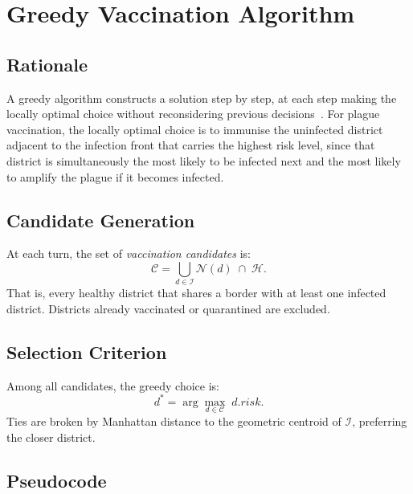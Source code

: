 \documentclass[conference]{IEEEtran}
\begin{document}
\section{Greedy Vaccination Algorithm}
\label{sec:greedy}

\subsection{Rationale}

A greedy algorithm constructs a solution step by step, at each step making the
locally optimal choice without reconsidering previous decisions~\cite{cormen2009introduction}.
For plague vaccination, the locally optimal choice is to immunise the
uninfected district adjacent to the infection front that carries the highest risk
level, since that district is simultaneously the most likely to be infected next
and the most likely to amplify the plague if it becomes infected.

\subsection{Candidate Generation}

At each turn, the set of \emph{vaccination candidates} is:
\begin{equation}
  \mathcal{C} = \bigcup_{d \in \mathcal{I}} \mathcal{N}(d) \;\cap\; \mathcal{H}.
  \label{eq:candidates}
\end{equation}
That is, every healthy district that shares a border with at least one infected
district. Districts already vaccinated or quarantined are excluded.

\subsection{Selection Criterion}

Among all candidates, the greedy choice is:
\begin{equation}
  d^* = \arg\max_{d \in \mathcal{C}}\; d.\mathit{risk}.
  \label{eq:greedy_choice}
\end{equation}
Ties are broken by Manhattan distance to the geometric centroid of $\mathcal{I}$,
preferring the closer district.

\subsection{Pseudocode}
\end{document}
